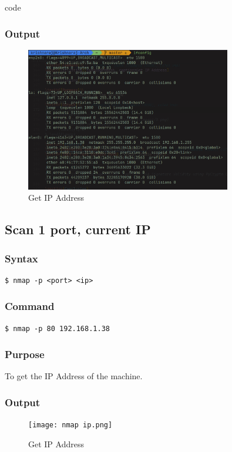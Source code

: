 code \documentclass[11pt]{article}
\begin{document}
\subsubsection*{Output}
\begin{figure}[H]
    \centering
    \includegraphics[width=0.8\textwidth]{ifconfig.png}
    \caption{Get IP Address}
    \label{fig:1}
\end{figure}

\subsection{Scan 1 port, current IP}

\subsubsection{Syntax}
\begin{verbatim}
$ nmap -p <port> <ip>
\end{verbatim}

\subsubsection*{Command}
\begin{verbatim}
$ nmap -p 80 192.168.1.38
\end{verbatim}

\subsubsection*{Purpose}
To get the IP Address of the machine.

\subsubsection*{Output}
\begin{figure}[H]
    \centering
    \texttt{[image: nmap ip.png]}
    \caption{Get IP Address}
    \label{fig:1}
\end{figure}
\end{document}
